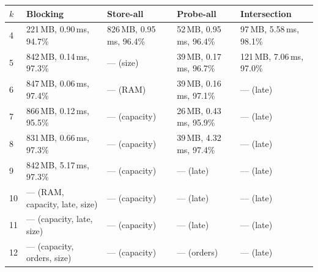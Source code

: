 \begin{tabular}{lllll}
\toprule
$k$ & Blocking & Store-all & Probe-all & Intersection\\
\midrule
4 & 221\,MB, 0.90\,ms, 94.7\% & 826\,MB, 0.95\,ms, 96.4\% & 52\,MB, 0.95\,ms, 96.4\% & 97\,MB, 5.58\,ms, 98.1\%\\
5 & 842\,MB, 0.14\,ms, 97.3\% & --- (size) & 39\,MB, 0.17\,ms, 96.7\% & 121\,MB, 7.06\,ms, 97.0\%\\
6 & 847\,MB, 0.06\,ms, 97.4\% & --- (RAM) & 39\,MB, 0.16\,ms, 97.1\% & --- (late)\\
7 & 866\,MB, 0.12\,ms, 95.5\% & --- (capacity) & 26\,MB, 0.43\,ms, 95.9\% & --- (late)\\
8 & 831\,MB, 0.66\,ms, 97.3\% & --- (capacity) & 39\,MB, 4.32\,ms, 97.4\% & --- (late)\\
9 & 842\,MB, 5.17\,ms, 97.3\% & --- (capacity) & --- (late) & --- (late)\\
10 & --- (RAM, capacity, late, size) & --- (capacity) & --- (late) & --- (late)\\
11 & --- (capacity, late, size) & --- (capacity) & --- (late) & --- (late)\\
12 & --- (capacity, orders, size) & --- (capacity) & --- (orders) & --- (late)\\
\bottomrule
\end{tabular}
